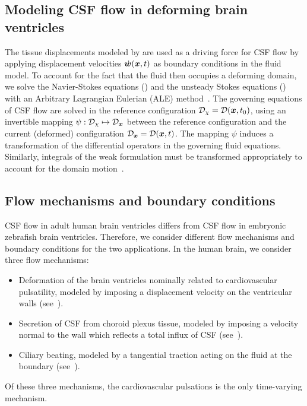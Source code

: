 \documentclass{template}
\begin{document}
\subsection{Modeling CSF flow in deforming brain ventricles}
The tissue displacements modeled by 
are used as a driving force for CSF flow by applying displacement velocities
$\dot{\bm{w}}(\bm{x}, t)$ as boundary conditions in the fluid model.
To account for the fact that the fluid then occupies a deforming domain,
we solve the Navier-Stokes equations ()
and the unsteady Stokes equations ()
with an Arbitrary Lagrangian Eulerian (ALE)
method~\citep{Duarte2004ALE,Scovazzi2007LectureNotes}.
The governing equations of CSF flow are solved in the reference configuration
$\mathcal{D}_{\chi} = \mathcal{D}(\bm{x}, t_0)$, using an invertible mapping
$\psi : \mathcal{D}_{\chi}\mapsto\mathcal{D}_{\bm{x}}$ between the reference configuration
and the current (deformed) configuration $\mathcal{D}_{\bm{x}} = \mathcal{D}(\bm{x}, t)$. 
The mapping $\psi$ induces a transformation of the differential operators
in the governing fluid equations. Similarly, integrals of the weak formulation
must be transformed appropriately to account for the
domain motion~\citep{Scovazzi2007LectureNotes}.

\subsection{Flow mechanisms and boundary conditions}
CSF flow in adult human brain ventricles differs from CSF flow in embryonic
zebrafish brain ventricles. Therefore, we consider different flow mechanisms
and boundary conditions for the two applications.
In the human brain, we consider three flow mechanisms:
\begin{itemize}
    \item Deformation of the brain ventricles nominally related to cardiovascular pulsatility,
    modeled by imposing a displacement velocity
    on the ventricular walls (see~).
    \item Secretion of CSF from choroid plexus tissue,
    modeled by imposing a velocity normal to the wall
    which reflects a total influx of CSF (see~).
    \item Ciliary beating, modeled by a tangential traction
    acting on the fluid at the boundary (see~).
\end{itemize}
Of these three mechanisms, the cardiovascular pulsations is the only time-varying mechanism.
\end{document}

